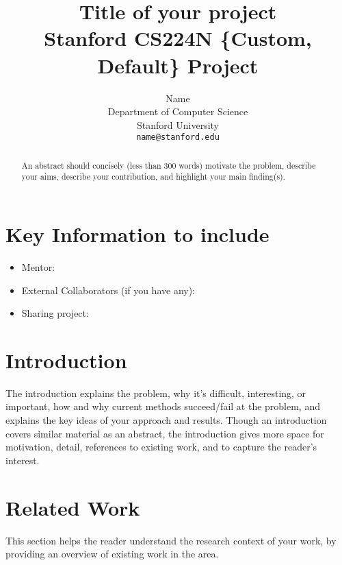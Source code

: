 \documentclass{article}
\title{
  Title of your project \\
  \vspace{1em}
  \small{\normalfont Stanford CS224N \{Custom, Default\} Project}  %
}
\author{
  Name \\
  Department of Computer Science \\
  Stanford University \\
  \texttt{name@stanford.edu} \\
}
\begin{document}
\maketitle

\begin{abstract}
	An abstract should concisely (less than 300 words) motivate the problem, describe your aims, describe your contribution, and highlight your main finding(s).
\end{abstract}


\section{Key Information to include}
\begin{itemize}
	\item Mentor:
	\item External Collaborators (if you have any):
	\item Sharing project:
\end{itemize}


\section{Introduction}
The introduction explains the problem, why it's difficult, interesting, or important, how and why current methods succeed/fail at the problem, and explains the key ideas of your approach and results. Though an introduction covers similar material as an abstract, the introduction gives more space for motivation, detail, references to existing work, and to capture the reader's interest.

\section{Related Work}
This section helps the reader understand the research context of your work, by providing an overview of existing work in the area.

\color{red}
\end{document}
